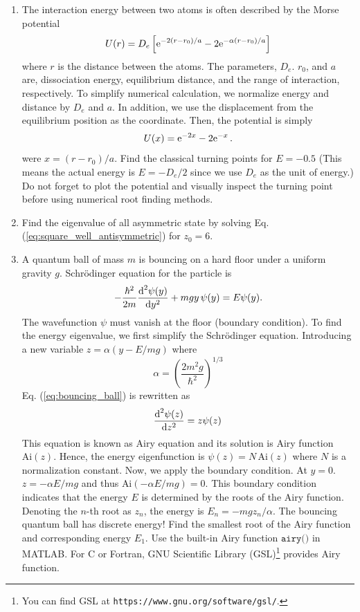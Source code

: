 \begin{enumerate}[labelwidth=0.5cm,labelindent=0cm,leftmargin=*,label=\bfseries \thechapter.\arabic*,align=left]
\item
The interaction energy between two atoms is often described by the Morse potential\cite{morse_potential}
\begin{equation}
U(r) = D_e \left [\text{e}^{-2 (r-r_0)/a} - 2 \text{e}^{-\alpha (r-r_0)/a} \right ]
\end{equation}
where $r$ is the distance between the atoms.  The parameters, $D_e$. $r_0$, and $a$ are, dissociation energy, equilibrium distance, and the range of interaction, respectively. To simplify numerical calculation, we normalize energy and distance by $D_e$ and $a$. In addition, we use the displacement from the equilibrium position as the coordinate.  Then, the potential is simply
\begin{equation}
U(x) = \text{e}^{-2x}-2 \text{e}^{-x}\,.
\end{equation}
were $x=(r-r_0)/a$.
Find the classical turning points for $E=-0.5$ (This means the actual energy is $E=-D_e/2$ since we use $D_e$ as the unit of energy.)
Do not forget to plot the potential and visually inspect the turning point before using numerical root finding methods.
\item
Find the eigenvalue of all asymmetric state by solving Eq. (\ref{eq:square_well_antisymmetric}) for $z_0=6$.

\item
A quantum ball of mass $m$ is bouncing on a hard floor under a uniform gravity $g$.\cite{qm_bounce}  Schr\"{o}dinger equation for the particle is
\begin{equation}
-\frac{\hbar^2}{2m} \frac{\text{d}^2 \psi(y)}{\text{d} y^2} + m g y\, \psi(y) = E \psi(y).
\label{eq:bouncing_ball}
\end{equation}
The wavefunction $\psi$ must vanish at the floor (boundary condition).  To find the energy eigenvalue, we first simplify the Schr\"{o}dinger equation. Introducing a new variable $z= \alpha (y-E/mg)$ where
\begin{equation}
\alpha = \left ( \frac{2 m^2 g}{\hbar^2} \right )^{1/3}
\end{equation}
Eq. (\ref{eq:bouncing_ball}) is rewritten as
\begin{equation}
\frac{\text{d}^2 \psi(z)}{\text{d} z^2} = z \psi(z)\,
\end{equation}
This equation is known as Airy equation and its solution is Airy function $\text{Ai}(z)$.  Hence, the energy eigenfunction is
$\psi(z) = N\, \text{Ai}(z)$ where $N$ is a normalization constant.  Now, we apply the boundary condition.   At $y=0$. $z=-\alpha E/mg$ and thus $\text{Ai}(-\alpha E/mg)=0$.  This boundary condition indicates that the energy $E$ is determined by the roots of the Airy function. 
Denoting the $n$-th root as $z_n$, the energy is $E_n=- m g z_n /\alpha$.  The bouncing quantum ball has discrete energy!
Find the smallest root of the Airy function and corresponding energy $E_1$.
Use the built-in Airy function $\texttt{airy()}$ in MATLAB.  For C or Fortran, GNU Scientific Library (GSL)\footnote{You can find GSL at 
\texttt{https://www.gnu.org/software/gsl/}.} provides Airy function.
\end{enumerate}

